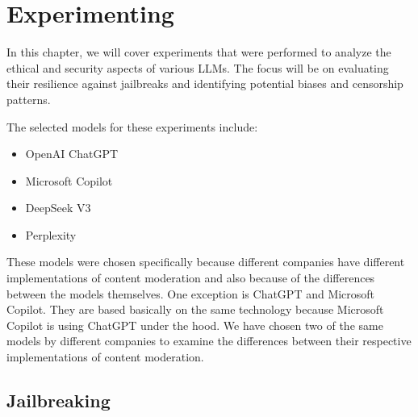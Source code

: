 \chapter{Experimenting}


In this chapter, we will cover experiments that were performed to analyze the ethical and security aspects of various LLMs. The focus will be on evaluating their resilience against jailbreaks and identifying potential biases and censorship patterns.

The selected models for these experiments include:
\begin{itemize}
    \item OpenAI ChatGPT
    \item Microsoft Copilot
    \item DeepSeek V3
    \item Perplexity


    
\end{itemize}

These models were chosen specifically because different companies have different implementations of content moderation and also because of the differences between the models themselves. One exception is ChatGPT and Microsoft Copilot. They are based basically on the same technology because Microsoft Copilot is using ChatGPT under the hood. We have chosen two of the same models by different companies to examine the differences between their respective implementations of content moderation.



\section{Jailbreaking}

